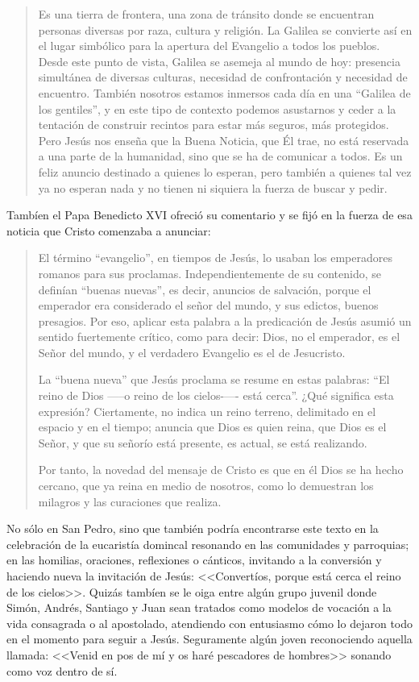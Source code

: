 \blockquote[{\cite{francisco2014angelus}}]{Es una tierra de frontera, una zona
  de tránsito donde se encuentran personas diversas por raza, cultura y
  religión. La Galilea se convierte así en el lugar simbólico para la apertura
  del Evangelio a todos los pueblos. Desde este punto de vista, Galilea se
  asemeja al mundo de hoy: presencia simultánea de diversas culturas, necesidad
  de confrontación y necesidad de encuentro. También nosotros estamos inmersos
  cada día en una \enquote{Galilea de los gentiles}, y en este tipo de contexto
  podemos asustarnos y ceder a la tentación de construir recintos para estar más
  seguros, más protegidos. Pero Jesús nos enseña que la Buena Noticia, que Él
  trae, no está reservada a una parte de la humanidad, sino que se ha de
  comunicar a todos. Es un feliz anuncio destinado a quienes lo esperan, pero
  también a quienes tal vez ya no esperan nada y no tienen ni siquiera la fuerza
  de buscar y pedir.}

Tambíen el Papa Benedicto XVI ofreció su comentario y se fijó en la fuerza de
esa noticia que Cristo comenzaba a anunciar:

\blockquote[{\cite{benedicto2008angelus}}]{El término ``evangelio'', en tiempos
  de Jesús, lo usaban los emperadores romanos para sus proclamas.
  Independientemente de su contenido, se definían ``buenas nuevas'', es decir,
  anuncios de salvación, porque el emperador era considerado el señor del mundo,
  y sus edictos, buenos presagios. \textelp{} Por eso, aplicar esta palabra a la
  predicación de Jesús asumió un sentido fuertemente crítico, como para decir:
  Dios, no el emperador, es el Señor del mundo, y el verdadero Evangelio es el
  de Jesucristo.

  La ``buena nueva'' que Jesús proclama se resume en estas palabras: ``El reino
  de Dios —--o reino de los cielos-—- está cerca''. ¿Qué significa esta
  expresión? Ciertamente, no indica un reino terreno, delimitado en el espacio y
  en el tiempo; anuncia que Dios es quien reina, que Dios es el Señor,
  y que su señorío está presente, es actual, se está realizando.

  Por tanto, la novedad del mensaje de Cristo es que en él Dios se ha hecho
  cercano, que ya reina en medio de nosotros, como lo demuestran los milagros y
  las curaciones que realiza.}

      No sólo en San Pedro, sino que también podría encontrarse este texto en la
      celebración de la eucaristía domincal resonando en las comunidades y parroquias;
      en las homilias, oraciones, reflexiones o cánticos, invitando a la conversión y
      haciendo nueva la invitación de Jesús: <<Convertíos, porque está cerca el reino
      de los cielos>>. Quizás tambíen se le oiga entre algún grupo juvenil donde
      Simón, Andrés, Santiago y Juan sean tratados como modelos de vocación a la vida
      consagrada o al apostolado, atendiendo con entusiasmo cómo lo dejaron todo en el
      momento para seguir a Jesús. Seguramente algún joven reconociendo aquella
      llamada: <<Venid en pos de mí y os haré pescadores de hombres>> sonando como voz
      dentro de sí.

